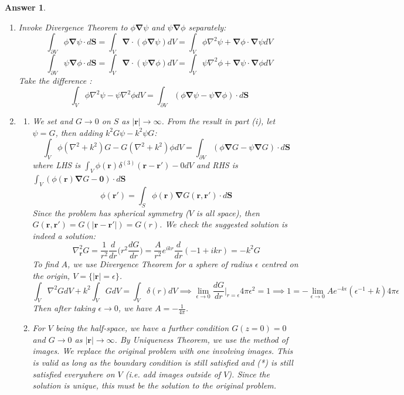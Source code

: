\documentclass[a4paper]{article}
\newtheorem{ans}{Answer}[section]
\theoremstyle{new}
\begin{document}
\begin{ans}\leavevmode
\begin{enumerate}[label=(\roman*)]
\item Invoke Divergence Theorem to $\phi\boldsymbol{\nabla}\psi$ and $\psi\boldsymbol{\nabla}\phi$ separately:
$$\int_{\partial V}\phi\boldsymbol{\nabla}\psi\cdot d\mathbf{S}=\int_V\boldsymbol{\nabla}\cdot(\phi\boldsymbol{\nabla}\psi)dV=\int_V\phi\nabla^2\psi+\boldsymbol{\nabla}\phi\cdot\boldsymbol{\nabla}\psi dV$$
$$\int_{\partial V}\psi\boldsymbol{\nabla}\phi\cdot d\mathbf{S}=\int_V\boldsymbol{\nabla}\cdot(\psi\boldsymbol{\nabla}\phi)dV=\int_V\psi\nabla^2\phi+\boldsymbol{\nabla}\psi\cdot\boldsymbol{\nabla}\phi dV$$
Take the difference :
$$\int_V\phi\nabla^2\psi-\psi\nabla^2\phi dV=\int_{\partial V}(\phi\boldsymbol{\nabla}\psi-\psi\boldsymbol{\nabla}\phi)\cdot d\mathbf{S}$$
\item 
\begin{enumerate}[label=(\alph*)]
\item We set
and $G\rightarrow 0$ on $S$ as $|\mathbf{r}|\rightarrow\infty$. From the result in part (i), let $\psi=G$, then adding $k^2G\psi-k^2\psi G$:
$$\int_V\phi(\nabla^2+k^2)G-G(\nabla^2+k^2)\phi dV=\int_{\partial V}(\phi\boldsymbol{\nabla}G-\psi\boldsymbol{\nabla}G)\cdot d\mathbf{S}$$
where LHS is $\int_V\phi(\mathbf{r})\delta^{(3)}(\mathbf{r}-\mathbf{r'})-0dV$ and RHS is $\int_V(\phi(\mathbf{r})\boldsymbol{\nabla}G-\boldsymbol{0})\cdot d\mathbf{S}$
$$\phi(\mathbf{r'})=\int_S\phi(\mathbf{r})\boldsymbol{\nabla}G(\mathbf{r},\mathbf{r'})\cdot d\mathbf{S}$$
Since the problem has spherical symmetry ($V$ is all space), then $G(\mathbf{r},\mathbf{r'})=G(|\mathbf{r}-\mathbf{r'}|)=G(r)$. We check the suggested solution is indeed a solution:
$$\nabla_{\mathbf{r}}^2G=\frac{1}{r^2}\frac{d}{dr}\bigg(r^2\frac{dG}{dr}\bigg)=\frac{A}{r^2}e^{ikr}\frac{d}{dr}(-1+ikr)=-k^2G$$
To find $A$, we use Divergence Theorem for a sphere of radius $\epsilon$ centred on the origin, $V=\{|\mathbf{r}|=\epsilon\}$.
$$\int_V\nabla^2GdV+k^2\int_VGdV=\int_V\delta(r)dV\implies\lim_{\epsilon\rightarrow0}\frac{dG}{dr}\bigg|_{r=\epsilon}4\pi\epsilon^2=1\implies 1=-\lim_{\epsilon\rightarrow0}Ae^{-k\epsilon}(\epsilon^{-1}+k)4\pi\epsilon$$
Then after taking $\epsilon\rightarrow 0$, we have $A=-\frac{1}{4\pi}$.
\item For $V$ being the half-space, we have a further condition $G(z=0)=0$ and $G\rightarrow 0$ as $|\mathbf{r}|\rightarrow\infty$. By Uniqueness Theorem, we use the method of images. We replace the original problem with one involving images. This is valid as long as the boundary condition is still satisfied and (*) is still satisfied everywhere on $V$ (i.e. add images outside of $V$). Since the solution is unique, this must be the solution to the original problem.\\[5pt]

\end{enumerate}
\end{enumerate}
\end{ans}
\end{document}
